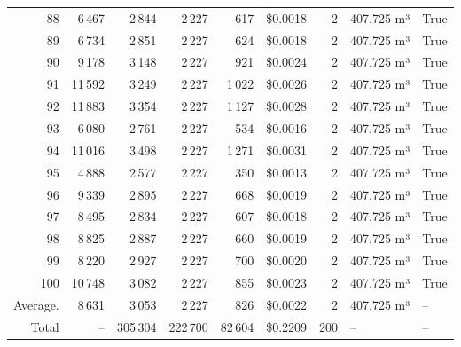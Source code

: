 \documentclass[a4paper,11pt]{article}
\begin{document}
\begin{table}[ht]
\begin{tabular}{r r r r r r r p{3cm} l}
88 & 6\,467 & 2\,844 & 2\,227 & 617 & \$0.0018 & 2 & 407.725 m³ & True \\
89 & 6\,734 & 2\,851 & 2\,227 & 624 & \$0.0018 & 2 & 407.725 m³ & True \\
90 & 9\,178 & 3\,148 & 2\,227 & 921 & \$0.0024 & 2 & 407.725 m³ & True \\
91 & 11\,592 & 3\,249 & 2\,227 & 1\,022 & \$0.0026 & 2 & 407.725 m³ & True \\
92 & 11\,883 & 3\,354 & 2\,227 & 1\,127 & \$0.0028 & 2 & 407.725 m³ & True \\
93 & 6\,080 & 2\,761 & 2\,227 & 534 & \$0.0016 & 2 & 407.725 m³ & True \\
94 & 11\,016 & 3\,498 & 2\,227 & 1\,271 & \$0.0031 & 2 & 407.725 m³ & True \\
95 & 4\,888 & 2\,577 & 2\,227 & 350 & \$0.0013 & 2 & 407.725 m³ & True \\
96 & 9\,339 & 2\,895 & 2\,227 & 668 & \$0.0019 & 2 & 407.725 m³ & True \\
97 & 8\,495 & 2\,834 & 2\,227 & 607 & \$0.0018 & 2 & 407.725 m³ & True \\
98 & 8\,825 & 2\,887 & 2\,227 & 660 & \$0.0019 & 2 & 407.725 m³ & True \\
99 & 8\,220 & 2\,927 & 2\,227 & 700 & \$0.0020 & 2 & 407.725 m³ & True \\
100 & 10\,748 & 3\,082 & 2\,227 & 855 & \$0.0023 & 2 & 407.725 m³ & True \\
\hline
Average. & 8\,631 & 3\,053 & 2\,227 & 826 & \$0.0022 & 2 & 407.725 m³ & -- \\
Total & -- & 305\,304 & 222\,700 & 82\,604 & \$0.2209 & 200 & -- & -- \\
\hline
\end{tabular}
\end{table}

\clearpage
\end{document}
